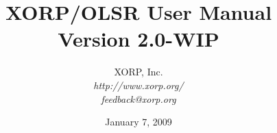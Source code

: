 \documentclass[11pt]{book}
\begin{document}
\title{{\Huge XORP/OLSR User Manual}\\
\vspace{1ex}
Version 2.0-WIP}
\author{ XORP, Inc.					\\
         {\it http://www.xorp.org/}			\\
	 {\it feedback@xorp.org}
}
\date{January 7, 2009}

\maketitle


%
%
\newcommand{\xorp}{{\small XORP}\xspace}
\newcommand{\xorpsh}{{\sf\small xorpsh}\xspace}
\newcommand{\rtrmgr}{{\sf\small xorp\_rtrmgr}\xspace}
\newcommand{\stt}{\tt\small}
\newcommand{\ssf}{\sf\small}




\tableofcontents




\end{document}
